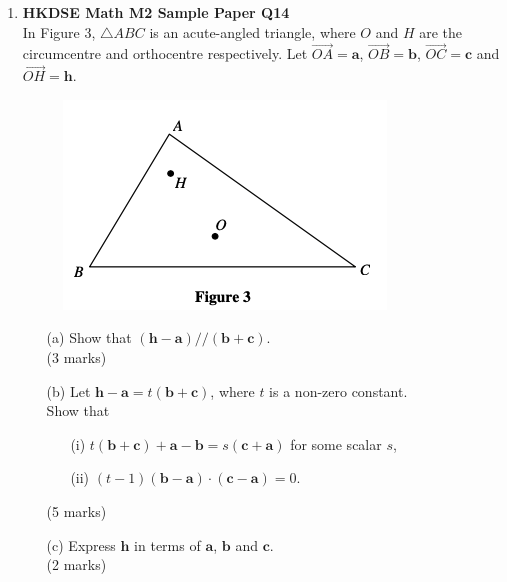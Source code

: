 \documentclass[12pt]{article}
\begin{document}
\begin{enumerate}
	\item \textbf{HKDSE Math M2 Sample Paper Q14}\\
	In Figure 3, $\triangle ABC$ is an acute-angled triangle, where $O$ and $H$ are the circumcentre and orthocentre respectively. Let $\overrightarrow{OA} = \textbf{a}$, $\overrightarrow{OB} = \textbf{b}$, $\overrightarrow{OC} = \textbf{c}$ and $\overrightarrow{OH} = \textbf{h}$.
	\begin{figure}[H]
		\centering
		\includegraphics[width = .5\linewidth]{SPFigure3}
	\end{figure}
	\begin{enumerate}
		\item [(a)]Show that $(\textbf{h} - \textbf{a})//(\textbf{b}+\textbf{c})$. \\(3 marks)
		\item [(b)]Let $\textbf{h} - \textbf{a} = t(\textbf{b}+\textbf{c})$, where $t$ is a non-zero constant.\\
		Show that 
		\begin{enumerate}
			\item [(i)]$t(\textbf{b}+\textbf{c}) + \textbf{a} - \textbf{b} = s(\textbf{c}+\textbf{a})$ for some scalar $s$, 
			\item [(ii)]$(t-1)(\textbf{b}-\textbf{a})\cdot (\textbf{c}-\textbf{a}) = 0$.
		\end{enumerate}
		(5 marks)
		\item[(c)]Express $\textbf{h}$ in terms of $\textbf{a}$, $\textbf{b}$ and $\textbf{c}$. \\(2 marks)
	\end{enumerate}
\end{enumerate}
\end{document}
